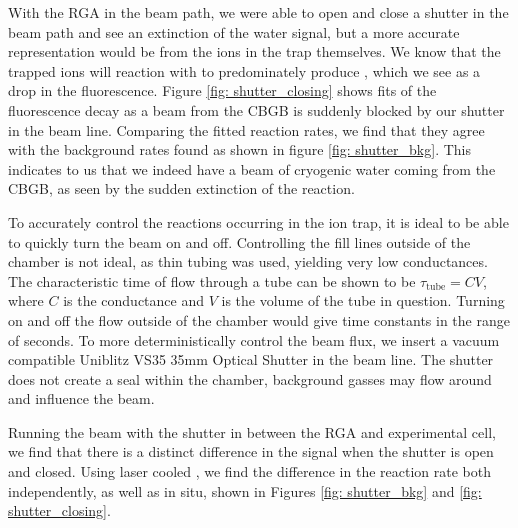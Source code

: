 With the RGA in the beam path, we were able to open and close a shutter in the beam path and see an extinction of the water signal, but a more accurate representation would be from the ions in the trap themselves. We know that the trapped  ions will reaction with  to predominately produce , which we see as a drop in the fluorescence. Figure \ref{fig: shutter_closing} shows fits of the fluorescence decay as a beam from the CBGB is suddenly blocked by our shutter in the beam line. Comparing the fitted reaction rates, we find that they agree with the background rates found as shown in figure \ref{fig: shutter_bkg}. This indicates to us that we indeed have a beam of cryogenic water coming from the CBGB, as seen by the sudden extinction of the  reaction.

To accurately control the reactions occurring in the ion trap, it is ideal to be able to quickly turn the beam on and off. Controlling the fill lines outside of the chamber is not ideal, as thin tubing was used, yielding very low conductances. The characteristic time of flow through a tube can be shown to be $\tau_{\mathrm{tube}} = C V$, where $C$ is the conductance and $V$ is the volume of the tube in question. Turning on and off the flow outside of the chamber would give time constants in the range of seconds. To more deterministically control the beam flux, we insert a vacuum compatible Uniblitz VS35 35mm Optical Shutter in the beam line. The shutter does not create a seal within the chamber, background gasses may flow around and influence the beam.

Running the beam with the shutter in between the RGA and experimental cell, we find that there is a distinct difference in the  signal when the shutter is open and closed. Using laser cooled , we find the difference in the reaction rate both independently, as well as in situ, shown in Figures \ref{fig: shutter_bkg} and \ref{fig: shutter_closing}.


